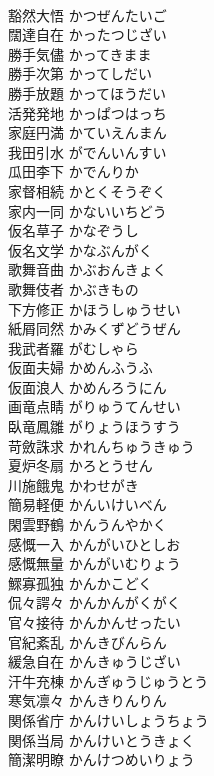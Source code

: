 \documentclass[8pt]{extreport}
\begin{document}
\begin{CJK}{UTF8}{min}
\\	豁然大悟	かつぜんたいご	
\\	闊達自在	かったつじざい	
\\	勝手気儘	かってきまま	
\\	勝手次第	かってしだい	
\\	勝手放題	かってほうだい	
\\	活発発地	かっぱつはっち	
\\	家庭円満	かていえんまん	
\\	我田引水	がでんいんすい	
\\	瓜田李下	かでんりか	
\\	家督相続	かとくそうぞく	
\\	家内一同	かないいちどう	
\\	仮名草子	かなぞうし	
\\	仮名文学	かなぶんがく	
\\	歌舞音曲	かぶおんきょく	
\\	歌舞伎者	かぶきもの	
\\	下方修正	かほうしゅうせい	
\\	紙屑同然	かみくずどうぜん	
\\	我武者羅	がむしゃら	
\\	仮面夫婦	かめんふうふ	
\\	仮面浪人	かめんろうにん	
\\	画竜点睛	がりゅうてんせい	
\\	臥竜鳳雛	がりょうほうすう	
\\	苛斂誅求	かれんちゅうきゅう	
\\	夏炉冬扇	かろとうせん	
\\	川施餓鬼	かわせがき	
\\	簡易軽便	かんいけいべん	
\\	閑雲野鶴	かんうんやかく	
\\	感慨一入	かんがいひとしお	
\\	感慨無量	かんがいむりょう	
\\	鰥寡孤独	かんかこどく	
\\	侃々諤々	かんかんがくがく	
\\	官々接待	かんかんせったい	
\\	官紀紊乱	かんきびんらん	
\\	緩急自在	かんきゅうじざい	
\\	汗牛充棟	かんぎゅうじゅうとう	
\\	寒気凛々	かんきりんりん	
\\	関係省庁	かんけいしょうちょう	
\\	関係当局	かんけいとうきょく	
\\	簡潔明瞭	かんけつめいりょう	

\end{CJK}
\end{document}
